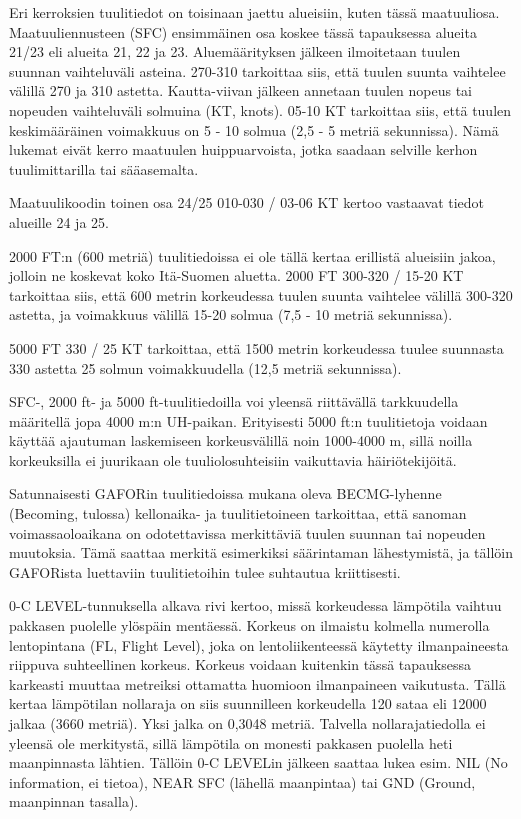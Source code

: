 Eri kerroksien tuulitiedot on toisinaan jaettu alueisiin, kuten tässä maatuuliosa. Maatuuliennusteen (SFC) ensimmäinen osa koskee tässä tapauksessa alueita 21/23 eli alueita 21, 22 ja 23. Aluemäärityksen jälkeen ilmoitetaan tuulen suunnan vaihteluväli asteina. 270-310 tarkoittaa siis, että tuulen suunta vaihtelee välillä 270 ja 310 astetta. Kautta-viivan jälkeen annetaan tuulen nopeus tai nopeuden vaihteluväli solmuina (KT, knots). 05-10 KT tarkoittaa siis, että tuulen keskimääräinen voimakkuus on 5 - 10 solmua (2,5 - 5 metriä sekunnissa). Nämä lukemat eivät kerro maatuulen huippuarvoista, jotka saadaan selville kerhon tuulimittarilla tai sääasemalta. 


Maatuulikoodin toinen osa 24/25 010-030 / 03-06 KT kertoo vastaavat tiedot alueille 24 ja 25. 


2000 FT:n (600 metriä) tuulitiedoissa ei ole tällä kertaa erillistä alueisiin jakoa, jolloin ne koskevat koko Itä-Suomen aluetta. 2000 FT 300-320 / 15-20 KT tarkoittaa siis, että 600 metrin korkeudessa tuulen suunta vaihtelee välillä 300-320 astetta, ja voimakkuus välillä 15-20 solmua (7,5 - 10 metriä sekunnissa). 


5000 FT 330 / 25 KT tarkoittaa, että 1500 metrin korkeudessa tuulee suunnasta 330 astetta 25 solmun voimakkuudella (12,5 metriä sekunnissa). 


SFC\mbox{-,} 2000 ft- ja 5000 ft-tuulitiedoilla voi yleensä riittävällä tarkkuudella määritellä jopa 4000 m:n UH-paikan. Erityisesti 5000 ft:n tuulitietoja voidaan käyttää ajautuman laskemiseen korkeusvälillä noin 1000-4000 m, sillä noilla korkeuksilla ei juurikaan ole tuuliolosuhteisiin vaikuttavia häiriötekijöitä. 


Satunnaisesti GAFORin tuulitiedoissa mukana oleva BECMG-lyhenne (Becoming, tulossa) kellonaika- ja tuulitietoineen tarkoittaa, että sanoman voimassaoloaikana on odotettavissa merkittäviä tuulen suunnan tai nopeuden muutoksia. Tämä saattaa merkitä esimerkiksi säärintaman lähestymistä, ja tällöin GAFORista luettaviin tuulitietoihin tulee suhtautua kriittisesti. 


0-C LEVEL-tunnuksella alkava rivi kertoo, missä korkeudessa lämpötila vaihtuu pakkasen puolelle ylöspäin mentäessä. Korkeus on ilmaistu kolmella numerolla lentopintana (FL, Flight Level), joka on lentoliikenteessä käytetty ilmanpaineesta riippuva suhteellinen korkeus. Korkeus voidaan kuitenkin tässä tapauksessa karkeasti muuttaa metreiksi ottamatta huomioon ilmanpaineen vaikutusta. Tällä kertaa lämpötilan nollaraja on siis suunnilleen korkeudella 120 sataa eli 12000 jalkaa (3660 metriä). Yksi jalka on 0,3048 metriä. Talvella nollarajatiedolla ei yleensä ole merkitystä, sillä lämpötila on monesti pakkasen puolella heti maanpinnasta lähtien. Tällöin 0-C LEVELin jälkeen saattaa lukea esim. NIL (No information, ei tietoa), NEAR SFC (lähellä maanpintaa) tai GND (Ground, maanpinnan tasalla). 


